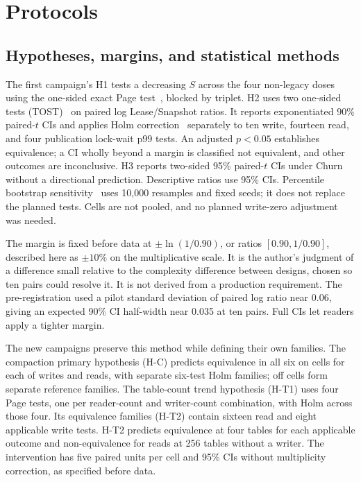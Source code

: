 \section{Protocols}
\subsection{Hypotheses, margins, and statistical methods}
The first campaign's H1 tests a decreasing $S$ across the four non-legacy doses using the one-sided exact Page test~\cite{page1963}, blocked by triplet. H2 uses two one-sided tests (TOST)~\cite{schuirmann1987,lakens2017} on paired log Lease/Snapshot ratios. It reports exponentiated 90\% paired-$t$ CIs and applies Holm correction~\cite{holm1979} separately to ten write, fourteen read, and four publication lock-wait p99 tests. An adjusted $p<0.05$ establishes equivalence; a CI wholly beyond a margin is classified not equivalent, and other outcomes are inconclusive. H3 reports two-sided 95\% paired-$t$ CIs under Churn without a directional prediction. Descriptive ratios use 95\% CIs. Percentile bootstrap sensitivity~\cite{efron1979} uses 10,000 resamples and fixed seeds; it does not replace the planned tests. Cells are not pooled, and no planned write-zero adjustment was needed.

The margin is fixed before data at $\pm\ln(1/0.90)$, or ratios $[0.90,1/0.90]$, described here as $\pm10\%$ on the multiplicative scale. It is the author's judgment of a difference small relative to the complexity difference between designs, chosen so ten pairs could resolve it. It is not derived from a production requirement. The pre-registration used a pilot standard deviation of paired log ratio near 0.06, giving an expected 90\% CI half-width near 0.035 at ten pairs. Full CIs let readers apply a tighter margin.

The new campaigns preserve this method while defining their own families. The compaction primary hypothesis (H-C) predicts equivalence in all six on cells for each of writes and reads, with separate six-test Holm families; off cells form separate reference families. The table-count trend hypothesis (H-T1) uses four Page tests, one per reader-count and writer-count combination, with Holm across those four. Its equivalence families (H-T2) contain sixteen read and eight applicable write tests. H-T2 predicts equivalence at four tables for each applicable outcome and non-equivalence for reads at 256 tables without a writer. The intervention has five paired units per cell and 95\% CIs without multiplicity correction, as specified before data.

